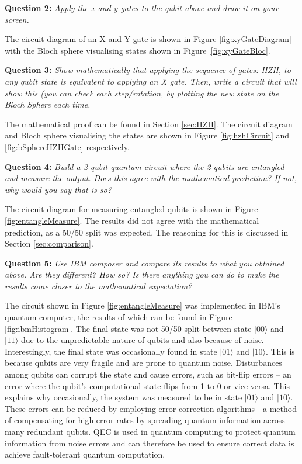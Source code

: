 \textbf{Question 2:}
\textit{Apply the x and y gates to the qubit above and draw it on your screen.}

The circuit diagram of an X and Y gate is shown in Figure \ref{fig:xyGateDiagram} with the Bloch sphere visualising states shown in Figure~\ref{fig:xyGateBloc}.

\textbf{Question 3:}
\textit{Show mathematically that applying the sequence of gates: HZH, to any qubit state is equivalent to applying an X gate. Then, write a circuit that will show this (you can check each step/rotation, by plotting the new state on the Bloch Sphere each time.}

The mathematical proof can be found in Section \ref{sec:HZH}. The circuit diagram and Bloch sphere visualising the states are shown in Figure \ref{fig:hzhCircuit} and \ref{fig:bSphereHZHGate} respectively.

\textbf{Question 4:}
\textit{Build a 2-qubit quantum circuit where the 2 qubits are entangled and measure the output. Does this agree with the mathematical prediction? If not, why would you say that is so?}

The circuit diagram for measuring entangled qubits is shown in Figure \ref{fig:entangleMeasure}. The results did not agree with the mathematical prediction, as a 50/50 split was expected. The reasoning for this is discussed in Section \ref{sec:comparison}.

\textbf{Question 5:}
\textit{Use IBM composer and compare its results to what you obtained above. Are they different? How so? Is there anything you can do to make the results come closer to the mathematical expectation?}

The circuit shown in Figure \ref{fig:entangleMeasure} was implemented in IBM's quantum computer, the results of which can be found in Figure \ref{fig:ibmHistogram}. The final state was not 50/50 split between state $|00\rangle$ and $|11\rangle$ due to the unpredictable nature of qubits and also because of noise. Interestingly, the final state was occasionally found in state $|01\rangle$ and $|10\rangle$. This is because qubits are very fragile and are prone to quantum noise. Disturbances among qubits can corrupt the state and cause errors, such as bit-flip errors -- an error where the qubit's computational state flips from 1 to 0 or vice versa. This explains why occasionally, the system was measured to be in state $|01\rangle$ and $|10\rangle$. These errors can be reduced by employing error correction algorithms - a method of compensating for high error rates by spreading quantum information across many redundant qubits. QEC is used in quantum computing to protect quantum information from noise errors and can therefore be used to ensure correct data is achieve fault-tolerant quantum computation. 

